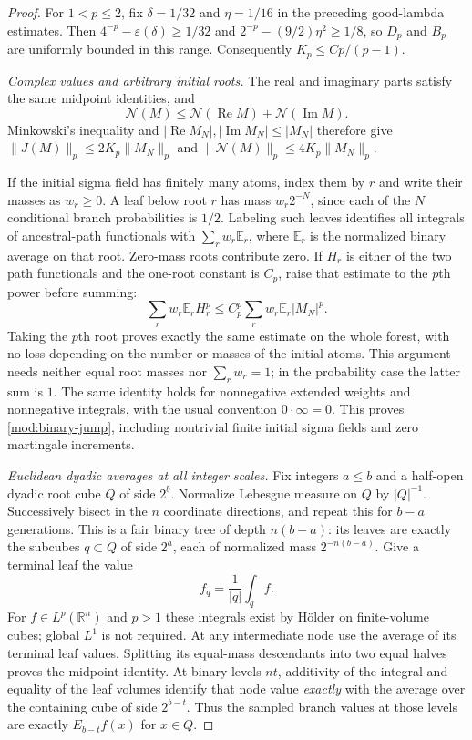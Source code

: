 \documentclass[11pt]{article}
\numberwithin{equation}{section}
\theoremstyle{remark}
\theoremstyle{definition}
\begin{document}
\begin{proof}
For $1<p\le2$, fix $\delta=1/32$ and $\eta=1/16$ in the preceding
good-lambda estimates. Then
$4^{-p}-\varepsilon(\delta)\ge1/32$ and
$2^{-p}-(9/2)\eta^2\ge1/8$, so $D_p$ and $B_p$ are uniformly bounded
in this range. Consequently $K_p\le C p/(p-1)$.

\emph{Complex values and arbitrary initial roots.}
The real and imaginary parts satisfy the same midpoint identities, and
\[
 \mathcal N(M)\le\mathcal N(\operatorname{Re}M)
                     +\mathcal N(\operatorname{Im}M).
\]
Minkowski's inequality and
$|\operatorname{Re}M_N|,|\operatorname{Im}M_N|\le|M_N|$ therefore give
$\|J(M)\|_p\le2K_p\|M_N\|_p$ and
$\|\mathcal N(M)\|_p\le4K_p\|M_N\|_p$.

If the initial sigma field has finitely many atoms, index them by
$r$ and write their masses as $w_r\ge0$. A leaf below root $r$
has mass $w_r2^{-N}$, since each of the $N$ conditional branch
probabilities is $1/2$. Labeling such leaves identifies all integrals
of ancestral-path functionals with
$\sum_r w_r\mathbb E_r$, where $\mathbb E_r$ is the normalized
binary average on that root. Zero-mass roots contribute zero.
If $H_r$ is either of the two path functionals and the one-root
constant is $C_p$, raise that estimate to the $p$th power before
summing:
\[
 \sum_r w_r\mathbb E_r H_r^p
 \le C_p^p\sum_r w_r\mathbb E_r|M_N|^p.
\]
Taking the $p$th root proves exactly the same estimate on the whole
forest, with no loss depending on the number or masses of the
initial atoms. This argument needs neither equal root masses nor
$\sum_r w_r=1$; in the probability case the latter sum is $1$.
The same identity holds for nonnegative extended weights and
nonnegative integrals, with the usual convention $0\cdot\infty=0$.
This proves \eqref{mod:binary-jump}, including nontrivial finite
initial sigma fields and zero martingale increments.

\emph{Euclidean dyadic averages at all integer scales.}
Fix integers $a\le b$ and a half-open dyadic root cube $Q$ of side
$2^b$. Normalize Lebesgue measure on $Q$ by $|Q|^{-1}$.
Successively bisect in the $n$ coordinate directions, and repeat
this for $b-a$ generations. This is a fair binary tree of depth
$n(b-a)$: its leaves are exactly the subcubes $q\subset Q$ of
side $2^a$, each of normalized mass $2^{-n(b-a)}$.
Give a terminal leaf the value
\[
 f_q=\frac1{|q|}\int_q f.
\]
For $f\in L^p(\mathbb R^n)$ and $p>1$ these integrals exist by
H\"older on finite-volume cubes; global $L^1$ is not required.
At any intermediate node use the average of its terminal leaf
values. Splitting its equal-mass descendants into two equal halves
proves the midpoint identity. At binary levels $nt$, additivity of
the integral and equality of the leaf volumes identify that node
value \emph{exactly} with the average over the containing cube of
side $2^{b-t}$. Thus the sampled branch values at those levels are
exactly $E_{b-t}f(x)$ for $x\in Q$.


\end{proof}
\end{document}
